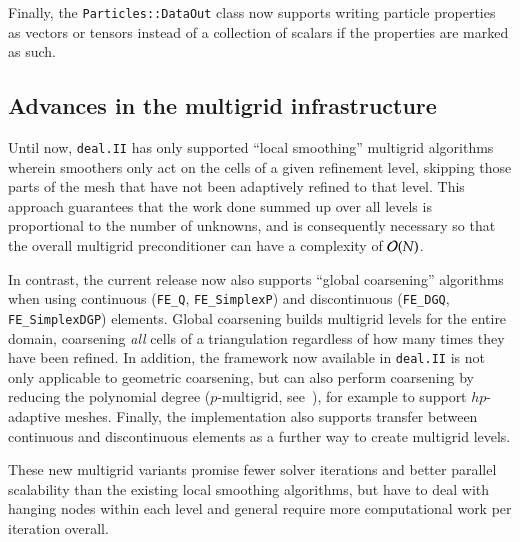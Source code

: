 \documentclass{ansarticle-preprint}
\newcommand{\specialword}[1]{\texttt{#1}}
\newcommand{\dealii}{{\specialword{deal.II}}\xspace}
\begin{document}
Finally, the \texttt{Particles::DataOut} class now supports writing particle
properties as vectors or tensors instead of a collection of scalars if the properties are
marked as such.


\subsection{Advances in the multigrid infrastructure}
\label{subsec:mg}

Until now, \dealii has only supported ``local smoothing'' multigrid
algorithms~\citep{ClevengerHeisterKanschatKronbichler2019} wherein
smoothers only act on the cells of a given refinement level,
skipping those parts of the mesh that have not been adaptively refined
to that level. This approach guarantees that the work done summed up
over all levels is proportional to the number of unknowns, and is
consequently necessary so that the overall multigrid preconditioner
can have a complexity of ${\cal O}(N)$.

In contrast, the current release now also supports ``global
coarsening'' algorithms \citep{becker2000multigrid, sundar2012parallel} when
using continuous (\texttt{FE\_Q}, \texttt{FE\_SimplexP}) and
discontinuous (\texttt{FE\_DGQ}, \texttt{FE\_SimplexDGP})
elements. Global coarsening builds multigrid levels for the entire
domain, coarsening \textit{all} cells of a triangulation regardless of
how many times they have been refined. In addition, the framework now available in
\dealii{} is not only applicable to geometric coarsening, but can also
perform coarsening by reducing the polynomial degree ($p$-multigrid,
see~\cite{Fehn2020}), for example
to support $hp$-adaptive meshes.
Finally, the implementation also supports transfer between continuous
and discontinuous elements as a further way to create multigrid levels.

These new multigrid variants promise fewer solver
iterations and better parallel scalability than the existing local
smoothing algorithms, but have to deal with
hanging nodes within each level and general require more computational
work per iteration overall.
\end{document}
